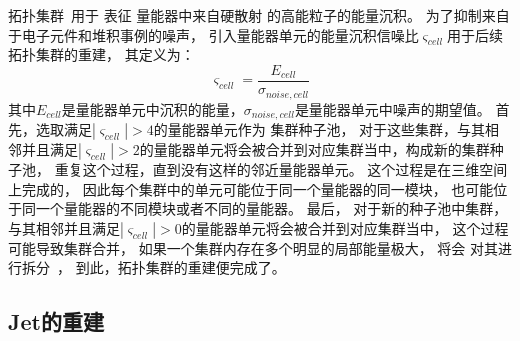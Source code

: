 拓扑集群~\cite{TOPOCLUSTER}用于
表征
量能器中来自硬散射
的高能粒子的能量沉积。
为了抑制来自于电子元件和堆积事例的噪声，
引入量能器单元的能量沉积信噪比$\varsigma_{cell}$用于后续拓扑集群的重建，
其定义为：
\begin{equation} 
\label{eq:TOPOSN1}
\varsigma_{cell}=\frac{E_{cell}}{\sigma_{noise,cell}}
\end{equation}
其中$E_{cell}$是量能器单元中沉积的能量，$\sigma_{noise,cell}$是量能器单元中噪声的期望值。
首先，选取满足$|\varsigma_{cell}|>4$的量能器单元作为
集群种子池，
对于这些集群，与其相邻并且满足$|\varsigma_{cell}|>2$的量能器单元将会被合并到对应集群当中，构成新的集群种子池，
重复这个过程，直到没有这样的邻近量能器单元。
这个过程是在三维空间上完成的，
因此每个集群中的单元可能位于同一个量能器的同一模块，
也可能位于同一个量能器的不同模块或者不同的量能器。
最后，
对于新的种子池中集群，
与其相邻并且满足$|\varsigma_{cell}|>0$的量能器单元将会被合并到对应集群当中，
这个过程可能导致集群合并，
如果一个集群内存在多个明显的局部能量极大，
将会
对其进行拆分~\cite{TOPOCLUSTER}，
到此，拓扑集群的重建便完成了。





\subsection{Jet的重建}
\label{sec:JET}

